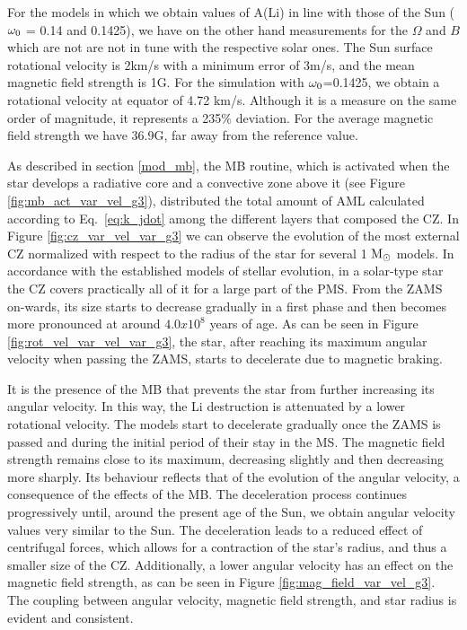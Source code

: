 \documentclass[fleqn,usenatbib]{mnras}
\begin{document}
For the models in which we obtain values of A(Li) in line with those of the Sun ($\omega_{\mathrm{0}}$ = 0.14 and 0.1425), we have on the other hand measurements for the $\Omega$ and $B$ which are not are not in tune with the respective solar ones. The Sun surface rotational velocity is 2km/s with a minimum error of 3m/s, and the mean magnetic field strength is 1G. For the simulation with $\omega_{\mathrm{0}}$=0.1425, we obtain a rotational velocity at equator of 4.72 km/s. Although it is a measure on the same order of magnitude, it represents a 235\% deviation. For the average magnetic field strength we have 36.9G, far away from the reference value.\par

As described in section \ref{mod_mb}, the MB routine, which is activated when the star develops a radiative core and a convective zone above it (see Figure \ref{fig:mb_act_var_vel_g3}), distributed the total amount of AML calculated according to Eq.~\ref{eq:k_jdot} among the different layers that composed the CZ. In Figure \ref{fig:cz_var_vel_var_g3} we can observe the evolution of the most external CZ normalized with respect to the radius of the star for several 1 $\mathrm{M}_\odot$ models. In accordance with the established models of stellar evolution, in a solar-type star the CZ covers practically all of it for a large part of the PMS. From the ZAMS on-wards, its size starts to decrease gradually in a first phase and then becomes more pronounced at around $4.0x10^8$ years of age. As can be seen in Figure \ref{fig:rot_vel_var_vel_var_g3}, the star, after reaching its maximum angular velocity when passing the ZAMS, starts to decelerate due to magnetic braking.\par

It is the presence of the MB that prevents the star from further increasing its angular velocity. In this way, the Li destruction is attenuated by a lower rotational velocity. The models start to decelerate gradually once the ZAMS is passed and during the initial period of their stay in the MS. The magnetic field strength remains close to its maximum, decreasing slightly and then decreasing more sharply. Its behaviour reflects that of the evolution of the angular velocity, a consequence of the effects of the MB. The deceleration process continues progressively until, around the present age of the Sun, we obtain angular velocity values very similar to the Sun. The deceleration leads to a reduced effect of centrifugal forces, which allows for a contraction of the star's radius, and thus a smaller size of the CZ. Additionally, a lower angular velocity has an effect on the magnetic field strength, as can be seen in Figure \ref{fig:mag_field_var_vel_g3}. The coupling between angular velocity, magnetic field strength, and star radius is evident and consistent.\par
\end{document}
